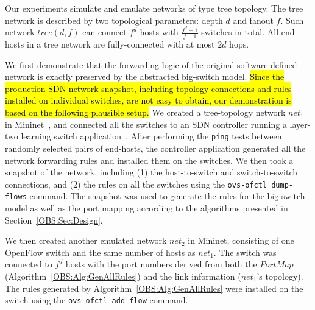 Our experiments simulate and emulate networks of type tree topology.
The tree network is described by two topological parameters: depth $d$ and fanout $f$.
Such network $tree(d, f)$ can connect $f^d$ hosts with $\frac{f^d - 1}{f-1}$ switches in total.
All end-hosts in a tree network are fully-connected with at most $2d$ hops.


We first demonstrate that the forwarding logic of the original software-defined network is exactly preserved by the abstracted big-switch model.
\hl{
    Since the production SDN network snapshot, including topology connections and rules installed on
individual switches, are not easy to obtain, our demonstration is based on the following plausible setup.
}
\fi
We created a tree-topology network $net_1$ in Mininet~\cite{Mininet},
and connected all the switches to an SDN controller running a layer-two learning switch application~\cite{Pox}.
After performing the \texttt{ping} tests between randomly selected pairs of end-hosts,
the controller application generated all the network forwarding rules and installed them on the switches.
We then took a snapshot of the network, including (1) the host-to-switch and switch-to-switch connections,
and (2) the rules on all the switches using the \texttt{ovs-ofctl dump-flows} command. The snapshot was used to generate the rules for the big-switch model as well as the port mapping according to the algorithms presented in Section~\ref{OBS:Sec:Design}.

We then created another emulated network $net_2$ in Mininet, consisting of one OpenFlow switch and the same number of hosts as $net_1$.
The switch was connected to $f^d$ hosts with the port numbers derived from both the $PortMap$ (Algorithm~\ref{OBS:Alg:GenAllRules})
and the link information ($net_1$'s topology).
The rules generated by Algorithm~\ref{OBS:Alg:GenAllRules} were installed on the switch using the \texttt{ovs-ofctl add-flow} command.

